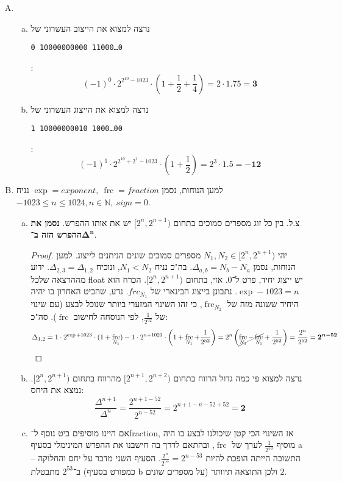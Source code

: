 \documentclass[]{article}
\newcommand\en[1] {\begin{otherlanguage}{english}#1\end{otherlanguage}}
\newcommand\ttt[1]{\en{\footnotesize\texttt{#1}\normalsize}}
\newcommand\N     {\mathbb{N}}
\newcommand\cl [1]    {\left ( #1 \right )}
\DeclareMathOperator{\frc}   {frc}
\begin{document}
	\section{}
	\begin{enumerate}[A)]
		\item \begin{enumerate}[a.]
			\item נרצה למצוא את הייצוב העשרוני של \ttt{0 10000000000 11000\dots0}: 
			\[ (-1)^0 \cdot 2^{2^{10} - 1023} \cdot \cl{1 + \frac{1}{2} + \frac{1}{4}} = 2 \cdot 1.75 = \bm{3} \]
			\item נרצה למצוא את הייצוג העשרוני של \ttt{1 10000000010 1000\dots00}: 
			\[ (-1)^1 \cdot 2^{2^{10} + 2^1 - 1023} \cdot \cl{1 + \frac{1}{2}} = 2^3 \cdot 1.5 = \bm{-12} \]
		\end{enumerate}
			\item למען הנוחות, נסמן $\exp = exponent, \ \frc = fraction$
			נניח $-1023 \le n \le 1024, n \in \N, \ sign = 0$. \begin{enumerate}[a.]
				\item צ.ל. בין כל זוג מספרים סמוכים בתחום $[2^n, 2^{n + 1})$ יש את אותו ההפרש. \textbf{נסמן את ההפרש הזה ב־}$\bm{\Delta^n}$. 
				\begin{proof}
					יהי $N_1, N_2 \in [2^n, 2^{n + 1})$ מספרים סמוכים שונים הניתנים לייצוג. למען הנוחות, נסמן $\Delta_{a, b} = N_b - N_a$. בה"כ נניח $N_1 < N_2$, ונוכיח $\Delta_{2, 3} = \Delta_{1, 2}$. ידוע מההרצאה שלכל float יש ייצוג יחיד, פרט ל־0. אזי, בתחום $[2^n, 2^{n + 1})$. הכרח הוא $\exp - 1023 = n$. נתבונן בייצוג הבינארי של $frc_{N_1}$. נדע, שהביט האחרון בו יהיה היחיד ששונה מזה של $\frc_{N_2}$, כי זהו השינוי המזערי ביותר שנוכל לבצע (עם שינוי של $\frac{1}{2^52}$, לפי הנוסחה לחישוב $\frc$). סה"כ: 
					\[ \Delta_{1, 2} = 1 \cdot 2^{\exp + 1023} \cdot (1 + \frc_{N_1}) - 1 \cdot 2^{n + 1023} \cdot \cl{1 + \frc_{N_1} + \frac{1}{2^{52}}} = 2^{n}\cl{\cancel{\frc_{N_1} - \frc_{N_1}} + \frac{1}{2^{52}}} = {\frac{2^{n}}{2^{52}}} = \bm{2^{n - 52}} \]
				\end{proof}
				\item נרצה למצוא פי כמה גדול הרווח בתחום $[2^{n + 1}, 2^{n + 2})$ מהרווח בתחום $[2^n, 2^{n + 1})$. נמצא את היחס: 
				\[ \frac{\Delta^{n + 1}}{\Delta^n} = \frac{2^{n + 1 - 52}}{2^{n - 52}} = 2^{n + 1 - n - 52 + 52} = \bm{2} \]
				\item אם היינו מוסיפים ביט נוסף ל־fraction, אז השינוי הכי קטן שיכולנו לבצע בו היה מוסיף $\frac{1}{2^{53}}$ לערך של $\frc$, ובהתאם לדרך בה חישבנו את ההפרש המינימלי בסעיף a – התשובה הייתה הופכת להיות $\frac{2^n}{2^{53}} = 2^{n - 53}$. הסעיף השני מדבר על יחס והחלוקה ב־$2^{53}$ מתבטלת (כמפורט בסעיף b על מספרים שונים) ולכן התוצאה תיוותר $2$. 

\end{enumerate}
\end{enumerate}
\end{document}
